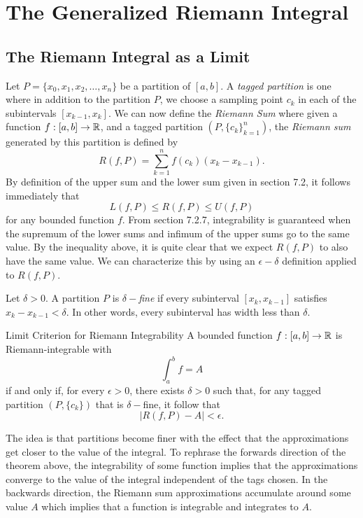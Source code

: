 \section{The Generalized Riemann Integral}

\subsection{The Riemann Integral as a Limit}

Let \( P = \{ x_{0}, x_{1}, x_{2}, \dots, x_{n} \}  \) be a partition of \( [a,b]  \). A \textit{tagged partition} is one where in addition to the partition \( P \), we choose a sampling point \( c_{k }  \) in each of the subintervals \( [x_{k-1}, x_{k }]  \). We can now define the \textit{Riemann Sum} where given a function \( f: [a,b] \to \mathbb{R}  \), and a tagged partition \( (P , \{ c_{k }  \} _{k=1}^{n}  ) \), the \textit{Riemann sum} generated by this partition is defined by 
\[  R(f,P ) = \sum_{ k=1 }^{ n } f(c_{k }) (x_{k } - x_{k-1}). \]
By definition of the upper sum and the lower sum given in section 7.2, it follows immediately that 
\[  L(f,P) \leq R(f,P) \leq U(f,P)   \] for any bounded function \( f  \). From section 7.2.7, integrability is guaranteed when the supremum of the lower sums and infimum of the upper sums go to the same value. By the inequality above, it is quite clear that we expect \( R(f,P ) \) to also have the same value. We can characterize this by using an \( \epsilon - \delta   \) definition applied to \( R(f,P)  \).
\begin{definition}
    Let \( \delta > 0   \). A partition \( P  \) is \( \delta- \)\textit{fine} if every subinterval \( [x_{k }, x_{k-1} ]  \) satisfies \( x_{k } - x_{k-1} <  \delta  \). In other words, every subinterval has width less than \( \delta  \).
\end{definition}

\begin{theorem}{Limit Criterion for Riemann Integrability}{}
    A bounded function \( f: [a,b] \to \mathbb{R}  \) is Riemann-integrable with 
    \[  \int_{ a }^{ b } f  = A  \] if and only if, for every \( \epsilon > 0 \), there exists \( \delta > 0  \) such that, for any tagged partition \( (P, \{ c_{k } \} ) \) that is \( \delta- \)fine, it follow that 
    \[  | R(f,P) - A  | < \epsilon. \]
    \end{theorem}

The idea is that partitions become finer with the effect that the approximations get closer to the value of the integral. To rephrase the forwards direction of the theorem above, the integrability of some function implies that the approximations converge to the value of the integral independent of the tags chosen. In the backwards direction, the Riemann sum approximations accumulate around some value \( A  \) which implies that a function is integrable and integrates to \( A  \). 

